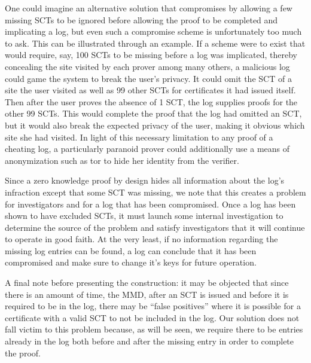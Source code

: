 \documentclass[letterpaper,twocolumn,10pt]{article}
\begin{document}
One could imagine an alternative solution that compromises by allowing a few missing SCTs to be ignored before allowing the proof to be completed and implicating a log, but even such a compromise scheme is unfortunately too much to ask. This can be illustrated through an example. If a scheme were to exist that would require, say, 100 SCTs to be missing before a log was implicated, thereby concealing the site visited by each prover among many others, a malicious log could game the system to break the user's privacy. It could omit the SCT of a site the user visited as well as 99 other SCTs for certificates it had issued itself. Then after the user proves the absence of 1 SCT, the log supplies proofs for the other 99 SCTs. This would complete the proof that the log had omitted an SCT, but it would also break the expected privacy of the user, making it obvious which site she had visited. In light of this necessary limitation to any proof of a cheating log, a particularly paranoid prover could additionally use a means of anonymization such as tor to hide her identity from the verifier. 

Since a zero knowledge proof by design hides all information about the log's infraction except that some SCT was missing, we note that this creates a problem for investigators and for a log that has been compromised. Once a log has been shown to have excluded SCTs, it must launch some internal investigation to determine the source of the problem and satisfy investigators that it will continue to operate in good faith. At the very least, if no information regarding the missing log entries can be found, a log can conclude that it has been compromised and make sure to change it's keys for future operation. 

A final note before presenting the construction: it may be objected that since there is an amount of time, the MMD, after an SCT is issued and before it is required to be in the log, there may be ``false positives'' where it is possible for a certificate with a valid SCT to not be included in the log. Our solution does not fall victim to this problem because, as will be seen, we require there to be entries already in the log both before and after the missing entry in order to complete the proof. 
\end{document}
